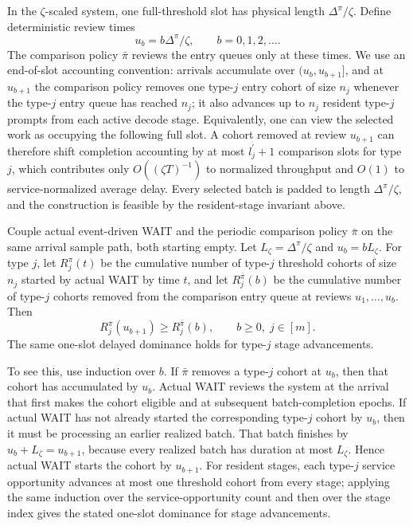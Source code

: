 In the \(\zeta\)-scaled system, one full-threshold slot has physical length \(\Delta^\pi/\zeta\). Define deterministic review times
\[
    u_b=b\Delta^\pi/\zeta,\qquad b=0,1,2,\ldots .
\]
The comparison policy \(\bar\pi\) reviews the entry queues only at these times. We use an end-of-slot accounting convention: arrivals accumulate over \((u_b,u_{b+1}]\), and at \(u_{b+1}\) the comparison policy removes one type-\(j\) entry cohort of size \(n_j\) whenever the type-\(j\) entry queue has reached \(n_j\); it also advances up to \(n_j\) resident type-\(j\) prompts from each active decode stage. Equivalently, one can view the selected work as occupying the following full slot. A cohort removed at review \(u_{b+1}\) can therefore shift completion accounting by at most \(l_j^\prime+1\) comparison slots for type \(j\), which contributes only \(O((\zeta T)^{-1})\) to normalized throughput and \(O(1)\) to service-normalized average delay. Every selected batch is padded to length \(\Delta^\pi/\zeta\), and the construction is feasible by the resident-stage invariant above.

\begin{lemma}\label{lem:wait_one_slot_dominance}
Couple actual event-driven WAIT and the periodic comparison policy \(\bar\pi\) on the same arrival sample path, both starting empty. Let \(L_\zeta=\Delta^\pi/\zeta\) and \(u_b=bL_\zeta\). For type \(j\), let \(R_j^\pi(t)\) be the cumulative number of type-\(j\) threshold cohorts of size \(n_j\) started by actual WAIT by time \(t\), and let \(R_j^{\bar\pi}(b)\) be the cumulative number of type-\(j\) cohorts removed from the comparison entry queue at reviews \(u_1,\ldots,u_b\). Then
\[
    R_j^\pi(u_{b+1})\ge R_j^{\bar\pi}(b),
    \qquad b\ge0,\; j\in[m].
\]
The same one-slot delayed dominance holds for type-\(j\) stage advancements.
\end{lemma}
\noindent To see this, use induction over \(b\). If \(\bar\pi\) removes a type-\(j\) cohort at \(u_b\), then that cohort has accumulated by \(u_b\). Actual WAIT reviews the system at the arrival that first makes the cohort eligible and at subsequent batch-completion epochs. If actual WAIT has not already started the corresponding type-\(j\) cohort by \(u_b\), then it must be processing an earlier realized batch. That batch finishes by \(u_b+L_\zeta=u_{b+1}\), because every realized batch has duration at most \(L_\zeta\). Hence actual WAIT starts the cohort by \(u_{b+1}\). For resident stages, each type-\(j\) service opportunity advances at most one threshold cohort from every stage; applying the same induction over the service-opportunity count and then over the stage index gives the stated one-slot dominance for stage advancements.

